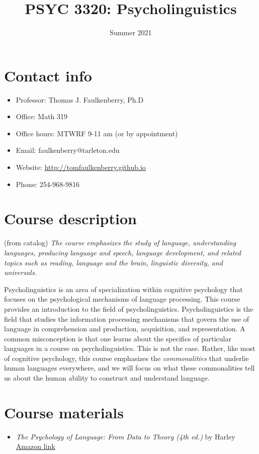 \documentclass[10pt]{article}
\date{Summer 2021}
\title{PSYC 3320: Psycholinguistics}
\begin{document}
\maketitle

\section*{Contact info}
\label{sec:orgd368cfa}
\begin{itemize}
\item Professor: Thomas J. Faulkenberry, Ph.D
\item Office: Math 319
\item Office hours: MTWRF 9-11 am (or by appointment)
\item Email: faulkenberry@tarleton.edu
\item Website: \url{http://tomfaulkenberry.github.io}
\item Phone: 254-968-9816
\end{itemize}

\section*{Course description}
\label{sec:org090fcd0}

(from catalog) \emph{The course emphasizes the study of language, understanding languages, producing language and speech, language development, and related topics such as reading, language and the brain, linguistic diversity, and universals.}

Psycholinguistics is an area of specialization within cognitive psychology that focuses on the psychological mechanisms of language processing.  This course provides an introduction to the field of psycholinguistics. Psycholinguistics is the field that studies the information processing mechanisms that govern the use of language in comprehension and production, acquisition, and representation.  A common misconception is that one learns about the specifics of particular languages in a course on psycholinguistics.  This is not the case.  Rather, like most of cognitive psychology, this course emphasizes the \emph{commonalities} that underlie human languages everywhere, and we will focus on what these commonalities tell us about the human ability to construct and understand language. 

\section*{Course materials}
\label{sec:orgf72cd41}
\begin{itemize}
\item \emph{The Psychology of Language: From Data to Theory (4th ed.)} by Harley \href{https://www.amazon.com/Psychology-Language-Data-Theory/dp/1848720890}{Amazon link}
\end{itemize}
\end{document}
